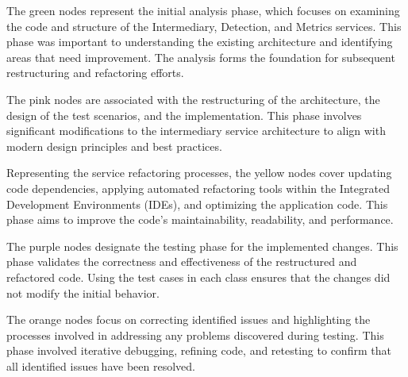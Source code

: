 The green nodes represent the initial analysis phase, which focuses on examining the code and structure of the Intermediary, Detection, and Metrics services. This phase was important to understanding the existing architecture and identifying areas that need improvement. The analysis forms the foundation for subsequent restructuring and refactoring efforts.

The pink nodes are associated with the restructuring of the architecture, the design of the test scenarios, and the implementation. This phase involves significant modifications to the intermediary service architecture to align with modern design principles and best practices. 

Representing the service refactoring processes, the yellow nodes cover updating code dependencies, applying automated refactoring tools within the Integrated Development Environments (IDEs), and optimizing the application code. This phase aims to improve the code's maintainability, readability, and performance. 

The purple nodes designate the testing phase for the implemented changes. This phase validates the correctness and effectiveness of the restructured and refactored code. Using the test cases in each class ensures that the changes did not modify the initial behavior. 

The orange nodes focus on correcting identified issues and highlighting the processes involved in addressing any problems discovered during testing. This phase involved iterative debugging, refining code, and retesting to confirm that all identified issues have been resolved.